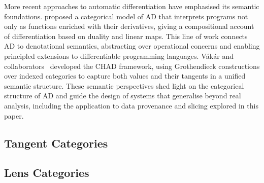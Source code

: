 More recent approaches to automatic differentiation have emphasised its semantic foundations.
\citet{elliott18} proposed a categorical model of AD that interprets programs not only as functions enriched
with their derivatives, giving a compositional account of differentiation based on duality and linear maps.
This line of work connects AD to denotational semantics, abstracting over operational concerns and enabling
principled extensions to differentiable programming languages. Vákár and
collaborators~\cite{vákár22,nunes2023} developed the CHAD framework, using Grothendieck constructions over
indexed categories to capture both values and their tangents in a unified semantic structure. These semantic
perspectives shed light on the categorical structure of AD and guide the design of systems that generalise
beyond real analysis, including the application to data provenance and slicing explored in this paper.

\subsection{\GPS}
\label{sec:related-work:galois-slicing}

\cite{berry79,berry82}

\subsection{Tangent Categories}

\cite{cockett14,cockett18}

\subsection{Lens Categories}

\cite{spivak19}
